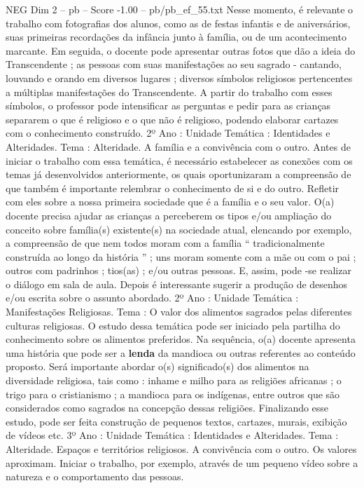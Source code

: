 \begin{textsample}{NEG Dim 2 – pb – Score -1.00 – pb/pb\_ef\_55.txt}
Nesse momento, é relevante o trabalho com fotografias dos alunos, como as de festas infantis e de aniversários, suas primeiras recordações da infância junto à família, ou de um acontecimento marcante.
Em seguida, o docente pode apresentar outras fotos que dão a ideia do Transcendente ; as pessoas com suas manifestações ao seu sagrado - cantando, louvando e orando em diversos lugares ; diversos símbolos religiosos pertencentes a múltiplas manifestações do Transcendente.
A partir do trabalho com esses símbolos, o professor pode intensificar as perguntas e pedir para as crianças separarem o que é religioso e o que não é religioso, podendo elaborar cartazes com o conhecimento construído. 2º Ano : Unidade Temática : Identidades e Alteridades.
Tema : Alteridade.
A família e a convivência com o outro.
Antes de iniciar o trabalho com essa temática, é necessário estabelecer as conexões com os temas já desenvolvidos anteriormente, os quais oportunizaram a compreensão de que também é importante relembrar o conhecimento de si e do outro.
Refletir com eles sobre a nossa primeira sociedade que é a família e o seu valor.
O(a) docente precisa ajudar as crianças a perceberem os tipos e/ou ampliação do conceito sobre família(s) existente(s) na sociedade atual, elencando por exemplo, a compreensão de que nem todos moram com a família “ tradicionalmente construída ao longo da história ” ; uns moram somente com a mãe ou com o pai ; outros com padrinhos ; tios(as) ; e/ou outras pessoas.
E, assim, pode -se realizar o diálogo em sala de aula.
Depois é interessante sugerir a produção de desenhos e/ou escrita sobre o assunto abordado. 2º Ano : Unidade Temática : Manifestações Religiosas.
Tema : O valor dos alimentos sagrados pelas diferentes culturas religiosas.
O estudo dessa temática pode ser iniciado pela partilha do conhecimento sobre os alimentos preferidos.
Na sequência, o(a) docente apresenta uma história que pode ser a \textbf{lenda} da mandioca ou outras referentes ao conteúdo proposto.
Será importante abordar o(s) significado(s) dos alimentos na diversidade religiosa, tais como : inhame e milho para as religiões africanas ; o trigo para o cristianismo ; a mandioca para os indígenas, entre outros que são considerados como sagrados na concepção dessas religiões.
Finalizando esse estudo, pode ser feita construção de pequenos textos, cartazes, murais, exibição de vídeos etc. 3º Ano : Unidade Temática : Identidades e Alteridades.
Tema : Alteridade.
Espaços e territórios religiosos.
A convivência com o outro.
Os valores aproximam.
Iniciar o trabalho, por exemplo, através de um pequeno vídeo sobre a natureza e o comportamento das pessoas.

\end{textsample}
